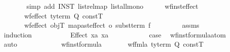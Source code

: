 \begin{isabellebody}
\ \ \ \ \ \ \isamarkupfalse%
\ {\isacharparenleft}{\kern0pt}simp\ add{\isacharcolon}{\kern0pt}\ INST{\isacharprime}{\kern0pt}\ list{\isachardot}{\kern0pt}rel{\isacharunderscore}{\kern0pt}map{\isacharparenleft}{\kern0pt}{}{\isacharparenright}{\kern0pt}\ list{\isacharunderscore}{\kern0pt}all{}{\isacharunderscore}{\kern0pt}mono{\isacharparenright}{\kern0pt}%
\endisatagproof
{\isafoldproof}%
%
\isadelimproof
\isanewline
%
\endisadelimproof
\isanewline
\ \ \ \ \isamarkupfalse%
\ wf{\isacharunderscore}{\kern0pt}inst{\isacharunderscore}{\kern0pt}effect{\isacharcolon}{\kern0pt}\isanewline
\ \ \ \ \ \ \ {\isachardoublequoteopen}wf{\isacharunderscore}{\kern0pt}effect\ {\isacharparenleft}{\kern0pt}ty{\isacharunderscore}{\kern0pt}term\ Q\ constT{\isacharparenright}{\kern0pt}\ {\isasymphi}{\isachardoublequoteclose}\isanewline
\ \ \ \ \ \ \ {\isachardoublequoteopen}wf{\isacharunderscore}{\kern0pt}effect\ objT\ {\isacharparenleft}{\kern0pt}{\isacharparenleft}{\kern0pt}map{\isacharunderscore}{\kern0pt}ast{\isacharunderscore}{\kern0pt}effect\ o\ subst{\isacharunderscore}{\kern0pt}term{\isacharparenright}{\kern0pt}\ f\ {\isasymphi}{\isacharparenright}{\kern0pt}{\isachardoublequoteclose}\isanewline
%
\isadelimproof
\ \ \ \ \ \ %
\endisadelimproof
%
\isatagproof
{}\isamarkupfalse%
\ assms\isanewline
\ \ \ \ \ \ \isamarkupfalse%
\ {\isacharparenleft}{\kern0pt}induction\ {\isasymphi}{\isacharparenright}{\kern0pt}\isanewline
\ \ \ \ \ \ \ \ \isamarkupfalse%
\ {\isacharparenleft}{\kern0pt}Effect\ x{}a\ x{}a{\isacharparenright}{\kern0pt}\isanewline
\ \ \ \ \ \ \ \ \isamarkupfalse%
\ \isamarkupfalse%
\ {\isacharquery}{\kern0pt}case\ \isamarkupfalse%
\ wf{\isacharunderscore}{\kern0pt}inst{\isacharunderscore}{\kern0pt}formula{\isacharunderscore}{\kern0pt}atom\ \isamarkupfalse%
\ auto\isanewline
\ \ \ \ \ \ \isamarkupfalse%
%
\endisatagproof
{\isafoldproof}%
%
\isadelimproof
\isanewline
%
\endisadelimproof
\isanewline
\ \ \ \ \isamarkupfalse%
\ wf{\isacharunderscore}{\kern0pt}inst{\isacharunderscore}{\kern0pt}formula{\isacharcolon}{\kern0pt}\isanewline
\ \ \ \ \ \ \ {\isachardoublequoteopen}wf{\isacharunderscore}{\kern0pt}fmla\ {\isacharparenleft}{\kern0pt}ty{\isacharunderscore}{\kern0pt}term\ Q\ constT{\isacharparenright}{\kern0pt}\ {\isasymphi}{\isachardoublequoteclose}\isanewline

\end{isabellebody}
